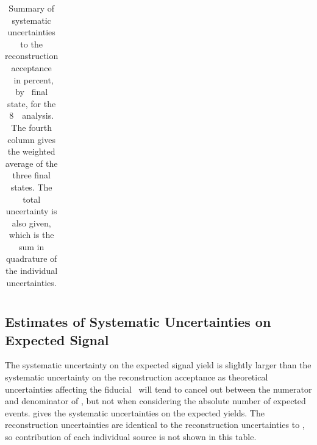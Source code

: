 \begin{table}[htbp]
\begin{tabular}{l c c c c}

   \end{tabular}
   \caption[Systematic uncertainties to the reconstruction acceptance \CZZ\ for
   the 8~\tev\ analysis.]
   {Summary of systematic uncertainties to the reconstruction acceptance \CZZ\
   in percent, by \ZZ\ final state, for the 8~\tev\ analysis. 
   The fourth column gives the weighted average
   of the three final states. The total uncertainty is also given, which is the
   sum in quadrature of the individual uncertainties.} 
   \label{table:objSel-syst-eight}
\end{table}

\subsection{Estimates of Systematic Uncertainties on Expected Signal}

The systematic uncertainty on the expected signal yield is slightly larger than the
systematic uncertainty on the reconstruction acceptance as theoretical
uncertainties affecting the fiducial \cx\ will tend to cancel out between the
numerator and denominator of \CZZ, but not when considering the absolute number
of expected events. \tab{objSel-syst-yield} gives the systematic uncertainties on
the expected yields. The reconstruction uncertainties are identical to the
reconstruction uncertainties to \CZZ, so contribution of each individual source
is not shown in this table.


